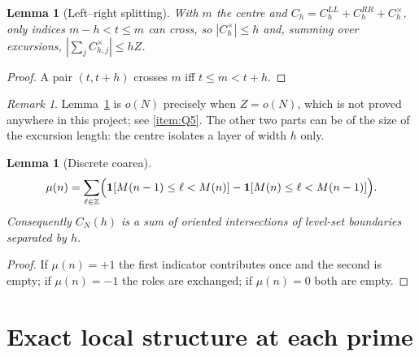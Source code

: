 \documentclass[11pt]{amsart}
\numberwithin{equation}{section}
\theoremstyle{plain}
\newtheorem{lemma}[theorem]{Lemma}
\theoremstyle{definition}
\theoremstyle{remark}
\newtheorem{remark}[theorem]{Remark}
\begin{document}
\begin{lemma}[Left--right splitting]
\label{lem:left_right}
With $m$ the centre and
$C_h=C_h^{LL}+C_h^{RR}+C_h^{\times}$, only indices
$m-h<t\le m$ can cross, so $|C_h^{\times}|\le h$ and, summing over
excursions, $|\sum_jC_{h,j}^{\times}|\le hZ$.
\end{lemma}

\begin{proof}
A pair $(t,t+h)$ crosses $m$ iff $t\le m<t+h$.
\end{proof}

\begin{remark}
\label{rem:Z_growth_is_the_hypothesis}
Lemma~\ref{lem:left_right} is $o(N)$ precisely when $Z=o(N)$, which is
not proved anywhere in this project; see \ref{item:Q5}. The other two
parts can be of the size of the excursion length: the centre isolates a
layer of width $h$ only.
\end{remark}

\begin{lemma}[Discrete coarea]
\label{lem:coarea}
\begin{equation}
\mu(n)=\sum_{\ell\in\mathbb Z}
\Bigl(\mathbf 1[M(n-1)\le\ell<M(n)]-\mathbf 1[M(n)\le\ell<M(n-1)]\Bigr).
\label{eq:coarea}
\end{equation}
Consequently $C_N(h)$ is a sum of oriented intersections of level-set
boundaries separated by $h$.
\end{lemma}

\begin{proof}
If $\mu(n)=+1$ the first indicator contributes once and the second is
empty; if $\mu(n)=-1$ the roles are exchanged; if $\mu(n)=0$ both are
empty.
\end{proof}

\section{Exact local structure at each prime}
\label{sec:local}
\end{document}
